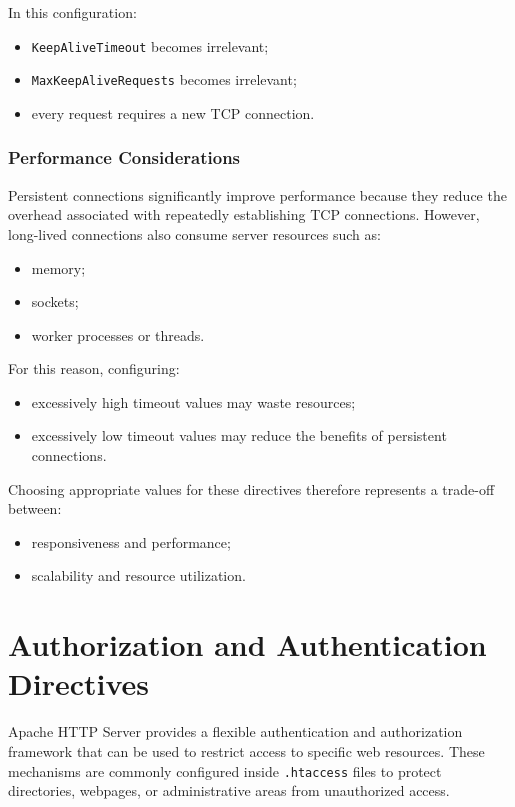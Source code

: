 \documentclass{scrbook}
\begin{document}
	In this configuration:
	\begin{itemize}
		\item \texttt{KeepAliveTimeout} becomes irrelevant;
		
		\item \texttt{MaxKeepAliveRequests} becomes irrelevant;
		
		\item every request requires a new TCP connection.
	\end{itemize}
	
	\subsubsection{Performance Considerations}
	
	Persistent connections significantly improve performance because they reduce the overhead associated with repeatedly establishing TCP connections. However, long-lived connections also consume server resources such as:
	\begin{itemize}
		\item memory;
		\item sockets;
		\item worker processes or threads.
	\end{itemize}
	
	For this reason, configuring:
	\begin{itemize}
		\item excessively high timeout values may waste resources;
		
		\item excessively low timeout values may reduce the benefits of persistent connections.
	\end{itemize}
	
	Choosing appropriate values for these directives therefore represents a trade-off between:
	\begin{itemize}
		\item responsiveness and performance;
		\item scalability and resource utilization.
	\end{itemize}
	
	\section{Authorization and Authentication Directives}
	
	Apache HTTP Server provides a flexible authentication and authorization framework that can be used to restrict access to specific web resources. These mechanisms are commonly configured inside \texttt{.htaccess} files to protect directories, webpages, or administrative areas from unauthorized access.\\
	
\end{document}
